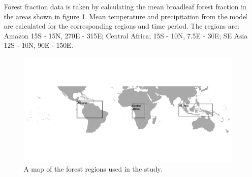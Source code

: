 \documentclass[gmd, manuscript]{copernicus} %
\begin{document}
Forest fraction data is taken by calculating the mean broadleaf forest fraction in the areas shown in figure \ref{fig:map_forests}. Mean temperature and precipitation from the model are calculated for the corresponding regions and time period. The regions are: Amazon 15\textdegree S - 15\textdegree N, 270\textdegree E - 315\textdegree E; Central Africa; 15\textdegree S - 10\textdegree N, 7.5\textdegree E - 30\textdegree E; SE Asia 12\textdegree S - 10\textdegree N, 90\textdegree E - 150\textdegree E.

\begin{figure}[t]
\includegraphics[width=12cm]{../graphics/map_forests_augmented.pdf}
\caption{A map of the forest regions used in the study. }
\label{fig:map_forests}
\end{figure}





\end{document}
